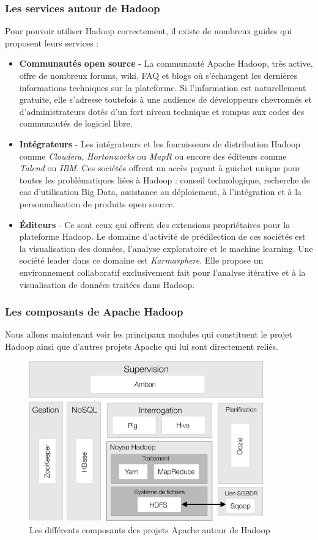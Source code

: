 \documentclass[12pt]{article}
\begin{document}
\subsubsection{Les services autour de Hadoop}
Pour pouvoir utiliser Hadoop correctement, il existe de nombreux guides qui proposent leurs services : 
\begin{itemize}
\item \textbf{Communautés open source} - La communauté Apache Hadoop, très active, offre de nombreux forums, wiki, FAQ et blogs où s'échangent les dernières informations techniques sur la plateforme. Si l'information est naturellement gratuite, elle s'adresse toutefois à une audience de développeurs chevronnés et d'administrateurs dotés d'un fort niveau technique et rompus aux codes des communautés de logiciel libre.
\item \textbf{Intégrateurs} - Les intégrateurs et les fournisseurs de distribution Hadoop comme \textit{Cloudera}, \textit{Hortonworks} ou \textit{MapR} ou encore des éditeurs comme \textit{Talend} ou \textit{IBM}. Ces sociétés offrent un accès payant à guichet unique pour toutes les problématiques liées à Hadoop : conseil technologique, recherche de cas d'utilisation Big Data, assistance au déploiement, à l'intégration et à la personnalisation de produits open source.
\item \textbf{Éditeurs} - Ce sont ceux qui offrent des extensions propriétaires pour la plateforme Hadoop. Le domaine d'activité de prédilection de ces sociétés est la visualisation des données, l'analyse exploratoire et le machine learning. Une société leader dans ce domaine est \textit{Karmasphere}. Elle propose un environnement collaboratif exclusivement fait pour l'analyse itérative et à la visualisation de données traitées dans Hadoop.
\end{itemize}
\subsubsection{Les composants de Apache Hadoop}
Nous allons maintenant voir les principaux modules qui constituent le projet Hadoop ainsi que d'autres projets Apache qui lui sont directement reliés.
\begin{figure}[H]
\centering
\includegraphics[width=0.9\textwidth]{hadoop_org}
\caption{Les différents composants des projets Apache autour de Hadoop}
\end{figure}
\end{document}
